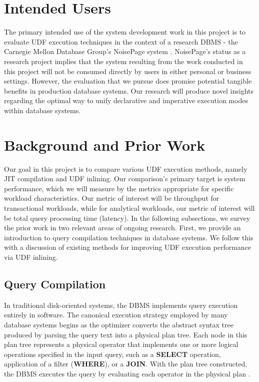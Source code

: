 \documentclass{vldb}
\newcommand{\dbCode}[1]{{\sffamily\small \textbf{#1}}\xspace}
\begin{document}
\section{Intended Users}

The primary intended use of the system development work in this project is to evaluate UDF execution techniques in the context of a research DBMS - the Carnegie Mellon Database Group's NoisePage system \cite{noisepage}. NoisePage's status as a research project implies that the system resulting from the work conducted in this project will not be consumed directly by users in either personal or business settings. However, the evaluation that we pursue does promise potential tangible benefits in production database systems. Our research will produce novel insights regarding the optimal way to unify declarative and imperative execution modes within database systems.


\section{Background and Prior Work}

Our goal in this project is to compare various UDF execution methods, namely JIT compilation and UDF inlining. Our comparison's primary target is system performance, which we will measure by the metrics appropriate for specific workload characteristics. Our metric of interest will be throughput for transactional workloads, while for analytical workloads, our metric of interest will be total query processing time (latency). In the following subsections, we survey the prior work in two relevant areas of ongoing research. First, we provide an introduction to query compilation techniques in database systems. We follow this with a discussion of existing methods for improving UDF execution performance via UDF inlining.

\subsection{Query Compilation}

In traditional disk-oriented systems, the DBMS implements query execution entirely in software. The canonical execution strategy employed by many database systems begins as the optimizer converts the abstract syntax tree produced by parsing the query text into a physical plan tree. Each node in this plan tree represents a physical operator that implements one or more logical operations specified in the input query, such as a \dbCode{SELECT} operation, application of a filter (\dbCode{WHERE}), or a \dbCode{JOIN}. With the plan tree constructed, the DBMS executes the query by evaluating each operator in the physical plan \cite{graefe93, graefe94, dbconcepts}. 
\end{document}

